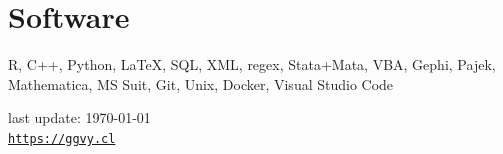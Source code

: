 \documentclass[letterpaper, 10pt]{article}
\def\footerlink{https://ggvy.cl}
\begin{document}
\section*{Software}

R, C++, Python, \LaTeX, SQL, XML, regex, Stata+Mata, VBA, Gephi, Pajek, Mathematica, MS Suit, Git, Unix, Docker, Visual Studio Code

\bigskip

\begin{center}
 \begin{footnotesize}
   last update: \today \\
   \href{\footerlink}{\texttt{\footerlink}}
 \end{footnotesize}
\end{center}
\end{document}
